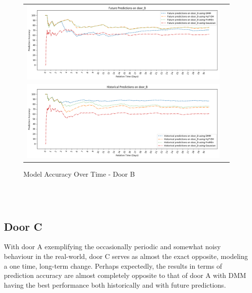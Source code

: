 \begin{center}
\begin{figure}[!Hp]
  \begin{tabular}{cc}
    {\includegraphics[width = 6in]{images/results/Future_Predictions_on_door_B.png}} \\
    {\includegraphics[width = 6in]{images/results/Historical_Predictions_on_door_B.png}} \\
  \end{tabular}
  \caption{Model Accuracy Over Time - Door B}
\end{figure}\\ \\
\end{center}


\subsection { Door C }

With door A exemplifying the occasionally periodic and somewhat noisy
behaviour in the real-world, door C serves as almost the exact opposite,
modeling a one time, long-term change.
Perhaps expectedly, the results in terms of prediction accuracy are
almost completely opposite to that of door A with DMM having the best
performance both historically and with future predictions. \\

